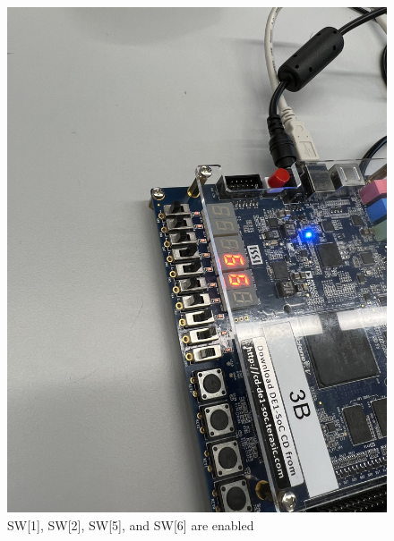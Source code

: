 \documentclass[
	letterpaper, %
	10pt, %
]{CSUniSchoolLabReport}
\begin{document}
\begin{figure}[H]
  \centering
  \includegraphics[width=.9\textwidth]{Figures/Two6.jpg}
  \caption{SW[1], SW[2], SW[5], and SW[6] are enabled}
  \label{fig:17}
\end{figure}
\end{document}
